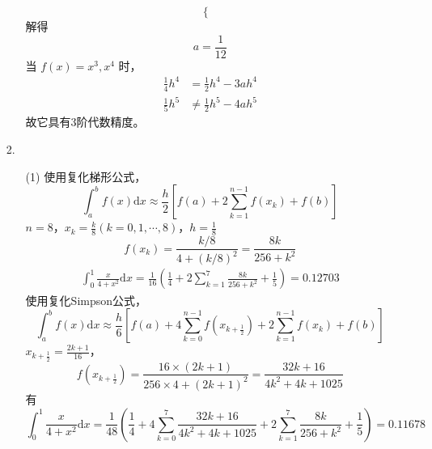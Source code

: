 \documentclass{sjtuarticle}
\def\dd{\mathrm{d}}
\begin{document}
\begin{itemize}
\begin{solution}
\begin{itemize}
\begin{equation*}
\begin{cases}
            \end{cases}
        \end{equation*}
        解得
        \begin{equation*}
            a = \frac{1}{12}
        \end{equation*}
        当 $f(x)=x^3,x^4$ 时，
        \begin{align*}
            \frac{1}{4}h^4 &= \frac{1}{2}h^4 -3ah^4 \\
            \frac{1}{5}h^5 &\neq \frac{1}{2}h^5 -4ah^5
        \end{align*}
        故它具有3阶代数精度。
    \end{itemize}
    \end{solution}
    \item[2.]\begin{solution}
        \begin{itemize}
            \item[(1)] 使用复化梯形公式，
            \begin{equation*}
                \int_{a}^b f(x)\dd x \approx \frac{h}{2}[f(a)+2\sum_{k=1}^{n-1}f(x_k)+f(b)]
            \end{equation*}
            $n=8$，$x_k=\frac{k}{8}(k=0,1,\cdots,8)$，$h=\frac{1}{8}$
            \begin{equation*}
                f(x_k)=\frac{k/8}{4+(k/8)^2}=\frac{8k}{256+k^2}
            \end{equation*}
            \begin{align*}
                \int_{0}^1 \frac{x}{4+x^2}\dd x = \frac{1}{16}\left(\frac{1}{4}+2\sum_{k=1}^{7}\frac{8k}{256+k^2}+\frac{1}{5}\right)=0.12703
            \end{align*}
            使用复化Simpson公式，
            \begin{equation*}
                \int_a^b f(x)\dd x \approx \frac{h}{6}[f(a)+4\sum_{k=0}^{n-1}f(x_{k+\frac{1}{2}})+2\sum_{k=1}^{n-1}f(x_k)+f(b)]
            \end{equation*}
            $x_{k+\frac{1}{2}}=\frac{2k+1}{16}$，
            \begin{equation*}
                f(x_{k+\frac{1}{2}})=\frac{16\times (2k+1)}{256\times 4+(2k+1)^2}=\frac{32k+16}{4k^2+4k+1025}
            \end{equation*}
            有
            \begin{equation*}
                \int_{0}^1 \frac{x}{4+x^2}\dd x = \frac{1}{48}\left(\frac{1}{4}+4\sum_{k=0}^7\frac{32k+16}{4k^2+4k+1025}+2\sum_{k=1}^7\frac{8k}{256+k^2}+\frac{1}{5}\right)=0.11678

\end{equation*}
\end{itemize}
\end{solution}
\end{itemize}
\end{document}
